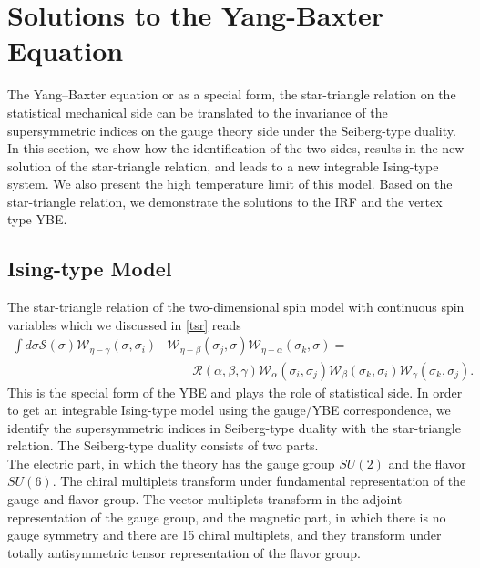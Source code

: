 \documentclass[a4paper,11pt]{article}%
\numberwithin{equation}{section}
\begin{document}
\section{Solutions to the Yang-Baxter Equation} \label{sol} \linespread{0.5}

The Yang–Baxter equation or as a special form, the star-triangle relation on the statistical mechanical side can be translated to the invariance of the supersymmetric indices on the gauge theory side under the Seiberg-type duality.
In this section, we show how the identification of the two sides, results in the new solution of the star-triangle relation, and leads to a new integrable Ising-type system. We also present the high temperature limit of this model. Based on the star-triangle relation, we demonstrate the solutions to the IRF and the vertex type YBE.


\subsection{Ising-type Model}\label{SL-Sbrg}
\linespread{0.5}

The star-triangle relation of the two-dimensional spin model with continuous spin variables which we discussed in \ref{tsr} reads
\begin{align}\nonumber\label{str}
     \int d \sigma \mathcal{S}( \sigma ) \mathcal{W}_{\eta-\gamma}(\sigma,\sigma_i)& \mathcal{W}_{\eta - \beta}( \sigma _{j}, \sigma) \mathcal{W}_{ \eta - \alpha}( \sigma_{k} , \sigma)=\\
    & \qquad \mathcal{R}(\alpha,\beta,\gamma)\mathcal{W}_{ \alpha }( \sigma _{i}, \sigma_{j})\mathcal{W}_{ \beta}( \sigma _{k}, \sigma_{i})\mathcal{W}_{ \gamma}( \sigma _{k}, \sigma_{j}).
\end{align}
This is the special form of the YBE and plays the role of statistical side. In order  to get  an integrable Ising-type model  using  the gauge/YBE correspondence, we identify the supersymmetric indices in Seiberg-type duality with the star-triangle relation. The Seiberg-type duality consists of two parts. \\
The electric part, in which the theory has the gauge group $SU(2)$ and the flavor $SU(6)$. The chiral multiplets transform under fundamental representation of the gauge and flavor group. The vector multiplets transform in the adjoint representation of the gauge group, and 
the magnetic part, in which there is no gauge symmetry and there are 15 chiral multiplets, and they transform under totally antisymmetric tensor representation of the flavor group.
\end{document}
